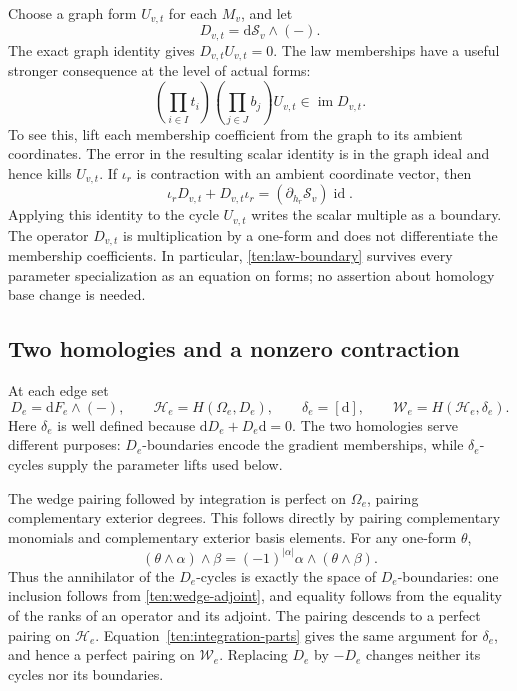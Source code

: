 Choose a graph form \(U_{v,t}\) for each \(M_v\), and let
\[
 D_{v,t}=\mathrm d\mathcal S_v\wedge(-).
\]
The exact graph identity gives \(D_{v,t}U_{v,t}=0\).
The law memberships have a useful stronger consequence at the level of
actual forms:
\begin{equation}\label{ten:law-boundary}
 \left(\prod_{i\in I}t_i\right)
 \left(\prod_{j\in J}b_j\right)U_{v,t}
                         \in\operatorname{im}D_{v,t}.
\end{equation}
To see this, lift each membership coefficient from the graph to its
ambient coordinates.  The error in the resulting scalar identity is in
the graph ideal and hence kills \(U_{v,t}\).  If \(\iota_r\) is contraction
with an ambient coordinate vector, then
\[
 \iota_rD_{v,t}+D_{v,t}\iota_r
             =(\partial_{h_r}\mathcal S_v)\operatorname{id}.
\]
Applying this identity to the cycle \(U_{v,t}\) writes the scalar multiple
as a boundary.  The operator \(D_{v,t}\) is multiplication by a one-form
and does not differentiate the membership coefficients.  In particular,
\eqref{ten:law-boundary} survives every parameter specialization as an
equation on forms; no assertion about homology base change is needed.

\subsection{Two homologies and a nonzero contraction}

At each edge set
\begin{equation}\label{ten:edge-homologies}
 D_e=\mathrm dF_e\wedge(-),\qquad
 \mathcal H_e=H(\Omega_e,D_e),\qquad
 \delta_e=[\mathrm d],\qquad
 \mathcal W_e=H(\mathcal H_e,\delta_e).
\end{equation}
Here \(\delta_e\) is well defined because
\(\mathrm dD_e+D_e\mathrm d=0\).  The two homologies serve different
purposes: \(D_e\)-boundaries encode the gradient memberships, while
\(\delta_e\)-cycles supply the parameter lifts used below.

The wedge pairing followed by integration is perfect on \(\Omega_e\),
pairing complementary exterior degrees.  This follows directly by
pairing complementary monomials and complementary exterior basis
elements.  For any one-form \(\theta\),
\begin{equation}\label{ten:wedge-adjoint}
 (\theta\wedge\alpha)\wedge\beta
           =(-1)^{|\alpha|}\alpha\wedge(\theta\wedge\beta).
\end{equation}
Thus the annihilator of the \(D_e\)-cycles is exactly the space of
\(D_e\)-boundaries: one inclusion follows from
\eqref{ten:wedge-adjoint}, and equality follows from the equality of the
ranks of an operator and its adjoint.  The pairing descends to a perfect
pairing on \(\mathcal H_e\).  Equation~\eqref{ten:integration-parts}
gives the same argument for \(\delta_e\), and hence a perfect pairing on
\(\mathcal W_e\).  Replacing \(D_e\) by \(-D_e\) changes neither its
cycles nor its boundaries.

